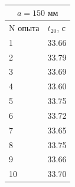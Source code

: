 \documentclass[a4paper]{article}
\begin{document}
\begin{itemize}
\begin{table}
\begin{minipage}{0.32\linewidth}
\begin{tabular}{|l|l|}
\hline
\multicolumn{2}{|c|}{$a = 150 \text{ мм}$} \\
\hline
N опыта & $t_{20}$, с  \\
\hline
1       &   33.66          \\
\hline
2       &   33.79             \\
\hline
3       &   33.69            \\
\hline
4       &   33.60          \\
\hline
5       &   33.75           \\
\hline
6       &   33.72            \\
\hline
7       &   33.65          \\
\hline
8       &   33.75             \\
\hline
9       &   33.66             \\
\hline
10      &   33.70    \\
\hline       
\end{tabular}
\caption{}
\end{minipage}
\end{table}


\end{itemize}
\end{document}
